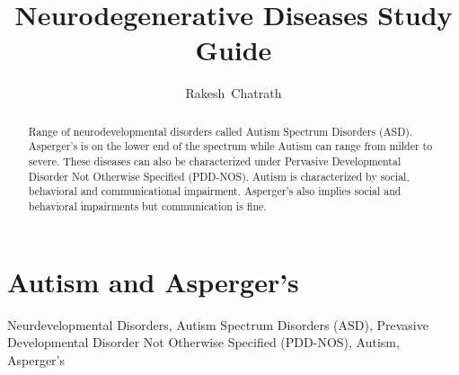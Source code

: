 \documentclass[journal]{IEEEtran}
\begin{document}
\title{Neurodegenerative Diseases Study Guide}
\author{Rakesh~Chatrath}
\maketitle
\section{Autism and Asperger's}
\begin{abstract}
Range of neurodevelopmental disorders called Autism Spectrum Disorders (ASD). Asperger's is on the lower end of the spectrum while Autism can range from milder to severe. These diseases can also be characterized under Pervasive Developmental Disorder Not Otherwise Specified (PDD-NOS). Autism is characterized by social, behavioral and communicational impairment. Asperger's also implies social and behavioral impairments but communication is fine.
\end{abstract}
\begin{IEEEkeywords}
Neurdevelopmental Disorders, Autism Spectrum Disorders (ASD), Prevasive Developmental Disorder Not Otherwise Specified (PDD-NOS), Autism, Asperger's
\end{IEEEkeywords}
\end{document}
